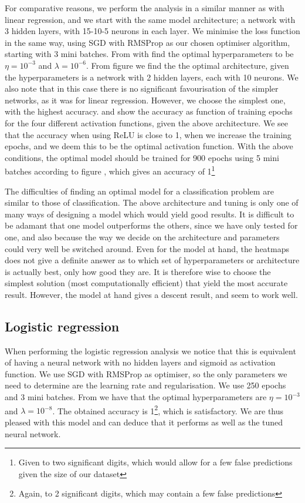     For comparative reasons, we perform the analysis in a similar manner as with linear regression, and we start with the same model architecture; a network with 3 hidden layers, with 15-10-5 neurons in each layer. We minimise the loss function in the same way, using SGD with RMSProp as our chosen optimiser algorithm, starting with 3 mini batches. From  with find the optimal hyperparameters to be $\eta=10^{-3}$ and $\lambda=10^{-6}$. From figure  we find the the optimal architecture, given the hyperparameters is a network with 2 hidden layers, each with 10 neurons. We also note that in this case there is no significant favourisation of the simpler networks, as it was for linear regression. However, we choose the simplest one, with the highest accuracy.  and  show the accuracy as function of training epochs for the four different activation functions, given the above architecture. We see that the accuracy when using ReLU is close to 1, when we increase the training epochs, and we deem this to be the optimal activation function. With the above conditions, the optimal model should be trained for 900 epochs using 5 mini batches according to figure , which gives an accuracy of 1\footnote{Given to two significant digits, which would allow for a few false predictions given the size of our dataset} 

    The difficulties of finding an optimal model for a classification problem are similar to those of classification. The above architecture and tuning is only one of many ways of designing a model which would yield good results. It is difficult to be adamant that one model outperforms the others, since we have only tested for one, and also because the way we decide on the architecture and parameters could very well be switched around. Even for the model at hand, the heatmaps does not give a definite answer as to which set of hyperparameters or architecture is actually best, only how good they are. It is therefore wise to choose the simplest solution  (most computationally efficient) that yield the most accurate result. However, the model at hand gives a descent result, and seem to work well.

\subsection{Logistic regression}\label{sec:analysis_logistic_regression}
    When performing the logistic regression analysis we notice that this is equivalent of having a neural network with no hidden layers and sigmoid as activation function. We use SGD with RMSProp as optimiser, so the only parameters we need to determine are the learning rate and regularisation. We use 250 epochs and 3 mini batches. From  we have that the optimal hyperparameters are $\eta=10^{-3}$ and $\lambda = 10^{-8}$. The obtained accuracy is 1\footnote{Again, to 2 significant digits, which may contain a few false predictions}, which is satisfactory. We are thus pleased with this model and can deduce that it performs as well as the tuned neural network. 
